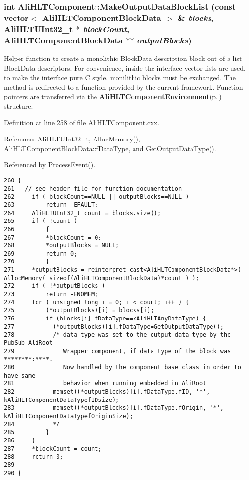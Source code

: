 \subsubsection{\setlength{\rightskip}{0pt plus 5cm}int Ali\-HLTComponent::Make\-Output\-Data\-Block\-List (const vector$<$ {\bf Ali\-HLTComponent\-Block\-Data} $>$ \& {\em blocks}, {\bf Ali\-HLTUInt32\_\-t} $\ast$ {\em block\-Count}, {\bf Ali\-HLTComponent\-Block\-Data} $\ast$$\ast$ {\em output\-Blocks})\hspace{0.3cm}{\tt  [protected]}}\label{classAliHLTComponent_b8}


Helper function to create a monolithic Block\-Data description block out of a list Block\-Data descriptors. For convenience, inside the interface vector lists are used, to make the interface pure C style, monilithic blocks must be exchanged. The method is redirected to a function provided by the current framework. Function pointers are transferred via the {\bf Ali\-HLTComponent\-Environment}{\rm (p.\,\pageref{structAliHLTComponentEnvironment})} structure. 

Definition at line 258 of file Ali\-HLTComponent.cxx.

References Ali\-HLTUInt32\_\-t, Alloc\-Memory(), Ali\-HLTComponent\-Block\-Data::f\-Data\-Type, and Get\-Output\-Data\-Type().

Referenced by Process\-Event().

\footnotesize\begin{verbatim}260 {
261   // see header file for function documentation
262     if ( blockCount==NULL || outputBlocks==NULL )
263         return -EFAULT;
264     AliHLTUInt32_t count = blocks.size();
265     if ( !count )
266         {
267         *blockCount = 0;
268         *outputBlocks = NULL;
269         return 0;
270         }
271     *outputBlocks = reinterpret_cast<AliHLTComponentBlockData*>( AllocMemory( sizeof(AliHLTComponentBlockData)*count ) );
272     if ( !*outputBlocks )
273         return -ENOMEM;
274     for ( unsigned long i = 0; i < count; i++ ) {
275         (*outputBlocks)[i] = blocks[i];
276         if (blocks[i].fDataType==kAliHLTAnyDataType) {
277           (*outputBlocks)[i].fDataType=GetOutputDataType();
278           /* data type was set to the output data type by the PubSub AliRoot
279              Wrapper component, if data type of the block was ********:****.
280              Now handled by the component base class in order to have same
281              behavior when running embedded in AliRoot
282           memset((*outputBlocks)[i].fDataType.fID, '*', kAliHLTComponentDataTypefIDsize);
283           memset((*outputBlocks)[i].fDataType.fOrigin, '*', kAliHLTComponentDataTypefOriginSize);
284           */
285         }
286     }
287     *blockCount = count;
288     return 0;
289 
290 }
\end{verbatim}\normalsize 


